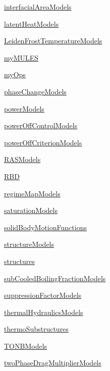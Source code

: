 \begin{DoxyCompactItemize}
\item 
 \hyperlink{namespaceFoam_1_1interfacialAreaModels}{interfacial\+Area\+Models}
\item 
 \hyperlink{namespaceFoam_1_1latentHeatModels}{latent\+Heat\+Models}
\item 
 \hyperlink{namespaceFoam_1_1LeidenFrostTemperatureModels}{Leiden\+Frost\+Temperature\+Models}
\item 
 \hyperlink{namespaceFoam_1_1myMULES}{my\+M\+U\+L\+ES}
\item 
 \hyperlink{namespaceFoam_1_1myOps}{my\+Ops}
\item 
 \hyperlink{namespaceFoam_1_1phaseChangeModels}{phase\+Change\+Models}
\item 
 \hyperlink{namespaceFoam_1_1powerModels}{power\+Models}
\item 
 \hyperlink{namespaceFoam_1_1powerOffControlModels}{power\+Off\+Control\+Models}
\item 
 \hyperlink{namespaceFoam_1_1powerOffCriterionModels}{power\+Off\+Criterion\+Models}
\item 
 \hyperlink{namespaceFoam_1_1RASModels}{R\+A\+S\+Models}
\item 
 \hyperlink{namespaceFoam_1_1RBD}{R\+BD}
\item 
 \hyperlink{namespaceFoam_1_1regimeMapModels}{regime\+Map\+Models}
\item 
 \hyperlink{namespaceFoam_1_1saturationModels}{saturation\+Models}
\item 
 \hyperlink{namespaceFoam_1_1solidBodyMotionFunctions}{solid\+Body\+Motion\+Functions}
\item 
 \hyperlink{namespaceFoam_1_1structureModels}{structure\+Models}
\item 
 \hyperlink{namespaceFoam_1_1structures}{structures}
\item 
 \hyperlink{namespaceFoam_1_1subCooledBoilingFractionModels}{sub\+Cooled\+Boiling\+Fraction\+Models}
\item 
 \hyperlink{namespaceFoam_1_1suppressionFactorModels}{suppression\+Factor\+Models}
\item 
 \hyperlink{namespaceFoam_1_1thermalHydraulicsModels}{thermal\+Hydraulics\+Models}
\item 
 \hyperlink{namespaceFoam_1_1thermoSubstructures}{thermo\+Substructures}
\item 
 \hyperlink{namespaceFoam_1_1TONBModels}{T\+O\+N\+B\+Models}
\item 
 \hyperlink{namespaceFoam_1_1twoPhaseDragMultiplierModels}{two\+Phase\+Drag\+Multiplier\+Models}
\end{DoxyCompactItemize}
